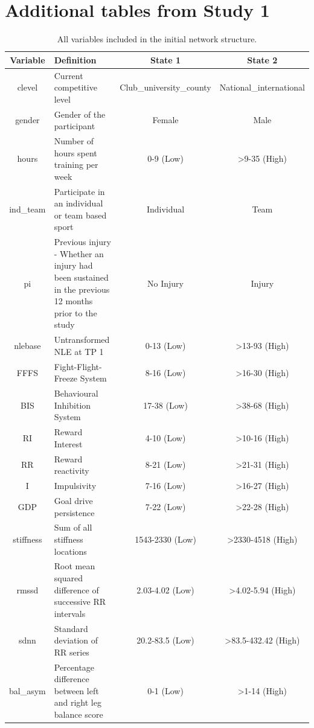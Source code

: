 \documentclass[
  english,
  man,floatsintext]{apa6}
\begin{document}
\hypertarget{additional-tables-from-study-1}{%
\section{Additional tables from Study 1}\label{additional-tables-from-study-1}}


\begin{longtable}[t]{c>{\raggedright\arraybackslash}p{5cm}cc}
\caption{\label{tab:cutoffvalues}All variables included in the initial network structure.}\\
\toprule
Variable & Definition & State 1 & State 2\\
\midrule
clevel & Current competitive level & Club\_university\_county & National\_international\\
gender & Gender of the participant & Female & Male\\
hours & Number of hours spent training per week & 0-9 (Low) & >9-35 (High)\\
ind\_team & Participate in an individual or team based sport & Individual & Team\\
pi & Previous injury - Whether an injury had been sustained in the previous 12 months prior to the study & No Injury & Injury\\
nlebase & Untransformed NLE at TP 1 & 0-13 (Low) & >13-93 (High)\\
FFFS & Fight-Flight-Freeze System & 8-16 (Low) & >16-30 (High)\\
BIS & Behavioural Inhibition System & 17-38 (Low) & >38-68 (High)\\
RI & Reward Interest & 4-10 (Low) & >10-16 (High)\\
RR & Reward reactivity & 8-21 (Low) & >21-31 (High)\\
I & Impulsivity & 7-16 (Low) & >16-27 (High)\\
GDP & Goal drive persistence & 7-22 (Low) & >22-28 (High)\\
stiffness & Sum of all stiffness locations & 1543-2330 (Low) & >2330-4518 (High)\\
rmssd & Root mean squared difference of successive RR intervals & 2.03-4.02 (Low) & >4.02-5.94 (High)\\
sdnn & Standard deviation of RR series & 20.2-83.5 (Low) & >83.5-432.42 (High)\\
bal\_asym & Percentage difference between left and right leg balance score & 0-1 (Low) & >1-14 (High)\\

\end{longtable}
\end{document}
